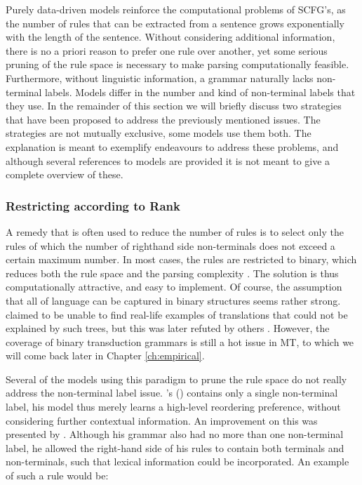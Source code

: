 \documentclass{report}
\theoremstyle{definition}
\theoremstyle{plain}
\def\citepos#1{\citeauthor{#1}'s (\citeyear{#1})}
\begin{document}
Purely data-driven models reinforce the computational problems of SCFG's, as the number of rules that can be extracted from a sentence grows exponentially with the length of the sentence\citep{quirk2006dependency}. Without considering additional information, there is no a priori reason to prefer one rule over another, yet some serious pruning of the rule space is necessary to make parsing computationally feasible. Furthermore, without linguistic information, a grammar naturally lacks non-terminal labels. Models differ in the number and kind of non-terminal labels that they use. In the remainder of this section we will briefly discuss two strategies that have been proposed to address the previously mentioned issues. The strategies are not mutually exclusive, some models use them both. The explanation is meant to exemplify endeavours to address these problems, and although several references to models are provided it is not meant to give a complete overview of these.

\subsubsection{Restricting according to Rank}

A remedy that is often used to reduce the number of rules is to select only the rules of which the number of righthand side non-terminals does not exceed a certain maximum number. In most cases, the rules are restricted to binary, which reduces both the rule space and the parsing complexity \citep[e.g,][]{wu1997stochastic,chiang2005hierarchical,mylonakis2011learning}. The solution is thus computationally attractive, and easy to implement. Of course, the assumption that all of language can be captured in binary structures seems rather strong. \citeauthor{wu1997stochastic} claimed to be unable to find real-life examples of translations that could not be explained by such trees, but this was later refuted by others \citep[e.g.,][]{galley2004s}. However, the coverage of binary transduction grammars is still a hot issue in MT, to which we will come back later in Chapter \ref{ch:empirical}. 

Several of the models using this paradigm to prune the rule space do not really address the non-terminal label issue. \citepos{wu1995algorithm} contains only a single non-terminal label, his model thus merely learns a high-level reordering preference, without considering further contextual information. An improvement on this was presented by \cite{chiang2005hierarchical,chiang2007hierarchical}. Although his grammar also had no more than one non-terminal label, he allowed the right-hand side of his rules to contain both terminals and non-terminals, such that lexical information could be incorporated. An example of such a rule would be:
\end{document}
